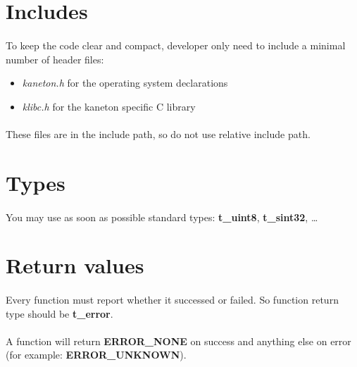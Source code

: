 \section*{Includes}

\paragraph{}
To keep the  code clear and compact, developer only  need to include a
minimal number of header files:

\begin{itemize}
\item \textit{kaneton.h} for the operating system declarations
\item \textit{klibc.h} for the kaneton specific C library
\end{itemize}

\paragraph{}
These files  are in the include  path, so do not  use relative include
path.

\section*{Types}

\paragraph{}
You  may use  as  soon as  possible  standard types:  \textbf{t\_uint8},
\textbf{t\_sint32}, \ldots{}

\section*{Return values}

\paragraph{}
Every function must report whether it successed or failed. So function
return type should be \textbf{t\_error}.

\paragraph{}
A function  will return  \textbf{ERROR\_NONE} on success  and anything
else on error (for example: \textbf{ERROR\_UNKNOWN}).

